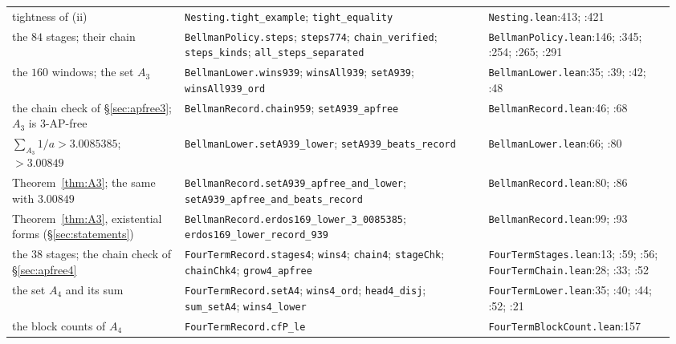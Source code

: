 \documentclass[11pt,a4paper]{article}
\theoremstyle{definition}
\theoremstyle{remark}
\newcommand{\code}[1]{\texttt{#1}}
\begin{document}
\begin{small}
\begin{longtable}{@{}>{\raggedright\arraybackslash}p{0.25\linewidth}>{\raggedright\arraybackslash}p{0.44\linewidth}>{\raggedright\arraybackslash}p{0.27\linewidth}@{}}
tightness of (ii) & \code{Nesting.\allowbreak{}tight\_\allowbreak{}example}; \code{tight\_\allowbreak{}equality} & \code{Nesting.\allowbreak{}lean}:413; :421 \\
the $84$ stages; their chain & \code{BellmanPolicy.\allowbreak{}steps}; \code{steps774}; \code{chain\_\allowbreak{}verified}; \code{steps\_\allowbreak{}kinds}; \code{all\_\allowbreak{}steps\_\allowbreak{}separated} & \code{BellmanPolicy.\allowbreak{}lean}:146; :345; :254; :265; :291 \\
the $160$ windows; the set $A_3$ & \code{BellmanLower.\allowbreak{}wins939}; \code{winsAll939}; \code{setA939}; \code{winsAll939\_\allowbreak{}ord} & \code{BellmanLower.\allowbreak{}lean}:35; :39; :42; :48 \\
the chain check of \S\ref{sec:apfree3}; $A_3$ is 3-AP-free & \code{BellmanRecord.\allowbreak{}chain959}; \code{setA939\_\allowbreak{}apfree} & \code{BellmanRecord.\allowbreak{}lean}:46; :68 \\
$\sum_{A_3} 1/a > 3.0085385$; $> 3.00849$ & \code{BellmanLower.\allowbreak{}setA939\_\allowbreak{}lower}; \code{setA939\_\allowbreak{}beats\_\allowbreak{}record} & \code{BellmanLower.\allowbreak{}lean}:66; :80 \\
Theorem~\ref{thm:A3}; the same with $3.00849$ & \code{BellmanRecord.\allowbreak{}setA939\_\allowbreak{}apfree\_\allowbreak{}and\_\allowbreak{}lower}; \code{setA939\_\allowbreak{}apfree\_\allowbreak{}and\_\allowbreak{}beats\_\allowbreak{}record} & \code{BellmanRecord.\allowbreak{}lean}:80; :86 \\
Theorem~\ref{thm:A3}, existential forms (\S\ref{sec:statements}) & \code{BellmanRecord.\allowbreak{}erdos169\_\allowbreak{}lower\_\allowbreak{}3\_\allowbreak{}0085385}; \code{erdos169\_\allowbreak{}lower\_\allowbreak{}record\_\allowbreak{}939} & \code{BellmanRecord.\allowbreak{}lean}:99; :93 \\
the $38$ stages; the chain check of \S\ref{sec:apfree4} & \code{FourTermRecord.\allowbreak{}stages4}; \code{wins4}; \code{chain4}; \code{stageChk}; \code{chainChk4}; \code{grow4\_\allowbreak{}apfree} & \code{FourTermStages.\allowbreak{}lean}:13; :59; :56; \code{FourTermChain.\allowbreak{}lean}:28; :33; :52 \\
the set $A_4$ and its sum & \code{FourTermRecord.\allowbreak{}setA4}; \code{wins4\_\allowbreak{}ord}; \code{head4\_\allowbreak{}disj}; \code{sum\_\allowbreak{}setA4}; \code{wins4\_\allowbreak{}lower} & \code{FourTermLower.\allowbreak{}lean}:35; :40; :44; :52; :21 \\
the block counts of $A_4$ & \code{FourTermRecord.\allowbreak{}cfP\_\allowbreak{}le} & \code{FourTermBlockCount.\allowbreak{}lean}:157 \\

\end{longtable}
\end{small}
\end{document}
